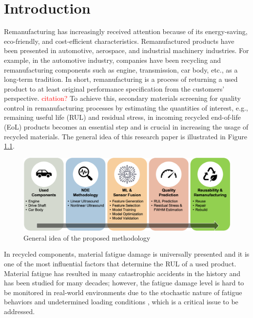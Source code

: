 \chapter{Introduction}
\label{chap: intro}
Remanufacturing has increasingly received attention because of its energy-saving, eco-friendly, and cost-efficient characteristics. Remanufactured products have been presented in automotive, aerospace, and industrial machinery industries. For example, in the automotive industry, companies have been recycling and remanufacturing components such as engine, transmission, car body, etc., as a long-term tradition. In short, remanufacturing is a process of returning a used product to at least original performance specification from the customers’ perspective. \textcolor{red}{citation?} To achieve this, secondary materials screening for quality control in remanufacturing processes by estimating the quantities of interest, e.g., remaining useful life (RUL) and residual stress, in incoming recycled end-of-life (EoL) products becomes an essential step and is crucial in increasing the usage of recycled materials. The general idea of this research paper is illustrated in Figure \ref{fig: general idea}.

\begin{figure}[tb]
    \centering
    \includegraphics[width=\linewidth]{fig/general_idea.png}
    \caption{General idea of the proposed methodology}
    \label{fig: general idea}
\end{figure}

In recycled components, material fatigue damage is universally presented and it is one of the most influential factors that determine the RUL of a used product. Material fatigue has resulted in many catastrophic accidents in the history and has been studied for many decades; however, the fatigue damage level is hard to be monitored in real-world environments due to the stochastic nature of fatigue behaviors and undetermined loading conditions \cite{fatigue-review-Santecchia2016}, which is a critical issue to be addressed.

